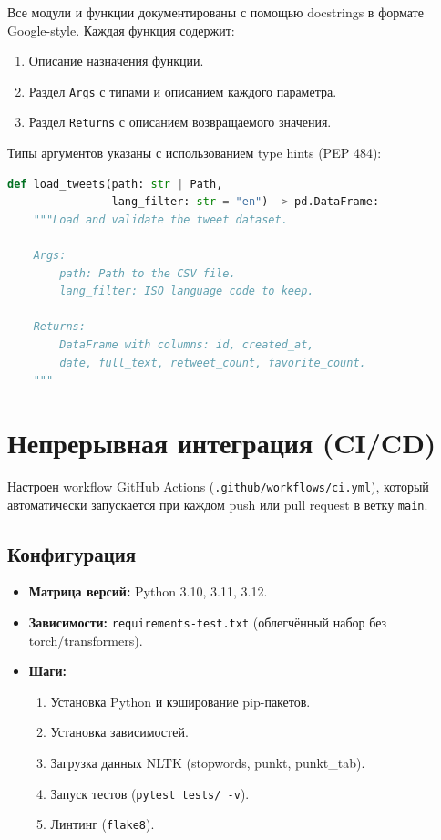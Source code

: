 \documentclass[a4paper,12pt]{article}
\begin{document}
Все модули и функции документированы с помощью docstrings в формате Google-style.
Каждая функция содержит:

\begin{enumerate}
  \item Описание назначения функции.
  \item Раздел \texttt{Args} с типами и описанием каждого параметра.
  \item Раздел \texttt{Returns} с описанием возвращаемого значения.
\end{enumerate}

Типы аргументов указаны с использованием type hints (PEP 484):

\begin{lstlisting}[language=Python, caption={Пример документированной функции}]
def load_tweets(path: str | Path,
                lang_filter: str = "en") -> pd.DataFrame:
    """Load and validate the tweet dataset.

    Args:
        path: Path to the CSV file.
        lang_filter: ISO language code to keep.

    Returns:
        DataFrame with columns: id, created_at,
        date, full_text, retweet_count, favorite_count.
    """
\end{lstlisting}


\section{Непрерывная интеграция (CI/CD)}

Настроен workflow GitHub Actions (\texttt{.github/workflows/ci.yml}),
который автоматически запускается при каждом push или pull request в ветку \texttt{main}.

\subsection{Конфигурация}

\begin{itemize}
  \item \textbf{Матрица версий:} Python 3.10, 3.11, 3.12.
  \item \textbf{Зависимости:} \texttt{requirements-test.txt} (облегчённый набор без torch/transformers).
  \item \textbf{Шаги:}
    \begin{enumerate}
      \item Установка Python и кэширование pip-пакетов.
      \item Установка зависимостей.
      \item Загрузка данных NLTK (stopwords, punkt, punkt\_tab).
      \item Запуск тестов (\texttt{pytest tests/ -v}).
      \item Линтинг (\texttt{flake8}).
    \end{enumerate}
\end{itemize}
\end{document}
